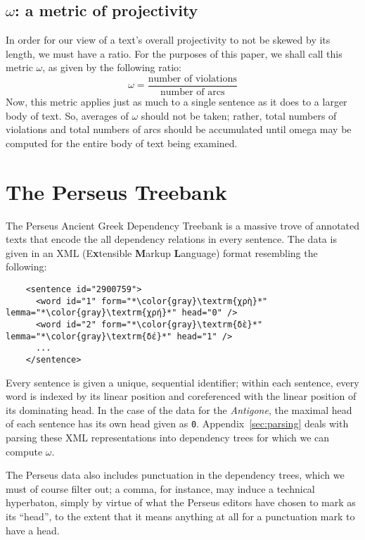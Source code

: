 \documentclass{article}
\newcommand{\FN}{\mathsf}
\begin{document}
\subsection{\ensuremath{\FN{\omega}}: a metric of projectivity}

In order for our view of a text's overall projectivity to not be skewed by its
length, we must have a ratio. For the purposes of this paper, we shall call this
metric $\omega$, as given by the following ratio:
%
\[ \omega = \frac{\text{number of violations}}{\text{number of arcs}} \]
%
Now, this metric applies just as much to a single sentence as it does to a
larger body of text. So, averages of \ensuremath{\FN{\omega}} should not be taken; rather, total
numbers of violations and total numbers of arcs should be accumulated until
omega may be computed for the entire body of text being examined.

\section{The Perseus Treebank}
%
The Perseus Ancient Greek Dependency Treebank is a massive trove of annotated
texts that encode the all dependency relations in every sentence. The data is
given in an XML (E\textbf{x}tensible \textbf{M}arkup \textbf{L}anguage) format
resembling the following:

\lstset{
  language=XML,
  escapeinside=**
}

\begin{lstlisting}
    <sentence id="2900759">
      <word id="1" form="*\color{gray}\textrm{χρὴ}*" lemma="*\color{gray}\textrm{χρή}*" head="0" />
      <word id="2" form="*\color{gray}\textrm{δὲ}*" lemma="*\color{gray}\textrm{δέ}*" head="1" />
      ...
    </sentence>
\end{lstlisting}

\noindent
%
Every sentence is given a unique, sequential identifier; within each sentence,
every word is indexed by its linear position and coreferenced with the linear
position of its dominating head. In the case of the data for the \emph{Antigone},
the maximal head of each sentence has its own head given as \lstinline{0}.
Appendix~\ref{sec:parsing} deals with parsing these XML representations into
dependency trees for which we can compute \ensuremath{\FN{\omega}}.

The Perseus data also includes punctuation in the dependency trees, which we
must of course filter out; a comma, for instance, may induce a technical
hyperbaton, simply by virtue of what the Perseus editors have chosen to mark as
its ``head'', to the extent that it means anything at all for a punctuation mark
to have a head.
\end{document}
